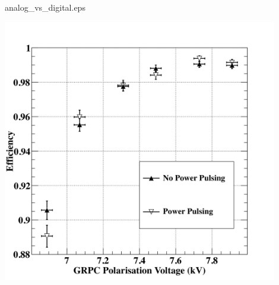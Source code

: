 \documentclass[10pt]{beamer}
\begin{document}
\begin{frame}{analog\_vs\_digital.eps}
    \centerline{\includegraphics[width=0.9\textwidth]{images/PowerPulsingHvScan}}
\end{frame}
\end{document}
